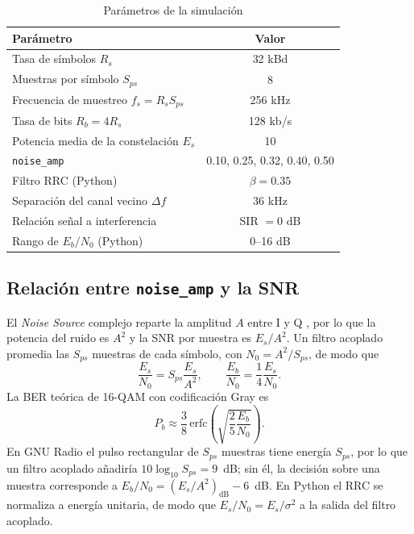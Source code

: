 \documentclass[twocolumn]{IEEEtran}
\begin{document}
\begin{table}[!ht]
\centering
\caption{Parámetros de la simulación}
\label{tab:parametros}
\footnotesize
\begin{tabular}{lc}
\toprule
\textbf{Parámetro} & \textbf{Valor} \\
\midrule
Tasa de símbolos $R_s$ & 32 kBd \\
Muestras por símbolo $S_{ps}$ & 8 \\
Frecuencia de muestreo $f_s = R_s S_{ps}$ & 256 kHz \\
Tasa de bits $R_b = 4R_s$ & 128 kb/s \\
Potencia media de la constelación $E_s$ & 10 \\
\texttt{noise\_amp} & 0.10, 0.25, 0.32, 0.40, 0.50 \\
Filtro RRC (Python) & $\beta = 0.35$ \\
Separación del canal vecino $\Delta f$ & 36 kHz \\
Relación señal a interferencia & SIR $=0$ dB \\
Rango de $E_b/N_0$ (Python) & 0--16 dB \\
\bottomrule
\end{tabular}
\end{table}

\subsection{Relación entre \texttt{noise\_amp} y la SNR}
\label{sub:snr}

El \textit{Noise Source} complejo reparte la amplitud $A$ entre I y Q \cite{gnuradioNoiseSource}, por lo que la potencia del ruido es $A^2$ y la SNR por muestra es $E_s/A^2$. Un filtro acoplado promedia las $S_{ps}$ muestras de cada símbolo, con $N_0=A^2/S_{ps}$, de modo que
\begin{equation}
\frac{E_s}{N_0} = S_{ps}\frac{E_s}{A^2}, \qquad \frac{E_b}{N_0} = \frac{1}{4}\frac{E_s}{N_0}.
\label{eq:snr}
\end{equation}
La BER teórica de 16-QAM con codificación Gray es \cite{proakis2008digital, sklar2001digital}
\begin{equation}
P_b \approx \frac{3}{8}\,\mathrm{erfc}\!\left(\sqrt{\frac{2}{5}\frac{E_b}{N_0}}\right).
\label{eq:ber}
\end{equation}
En GNU Radio el pulso rectangular de $S_{ps}$ muestras tiene energía $S_{ps}$, por lo que un filtro acoplado añadiría $10\log_{10}S_{ps}=9$~dB; sin él, la decisión sobre una muestra corresponde a $E_b/N_0 = (E_s/A^2)_{\mathrm{dB}} - 6$~dB. En Python el RRC se normaliza a energía unitaria, de modo que $E_s/N_0 = E_s/\sigma^2$ a la salida del filtro acoplado.
\end{document}
